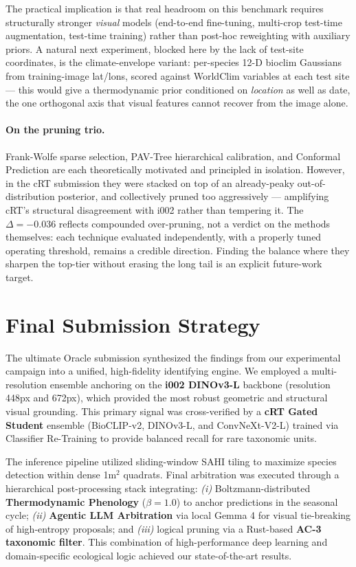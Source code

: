 \documentclass[10pt,twocolumn,letterpaper]{article}
\begin{document}
The practical implication is that real headroom on this benchmark requires structurally stronger \emph{visual} models (end-to-end fine-tuning, multi-crop test-time augmentation, test-time training) rather than post-hoc reweighting with auxiliary priors. A natural next experiment, blocked here by the lack of test-site coordinates, is the climate-envelope variant: per-species 12-D bioclim Gaussians from training-image lat/lons, scored against WorldClim variables at each test site --- this would give a thermodynamic prior conditioned on \emph{location} as well as date, the one orthogonal axis that visual features cannot recover from the image alone.

\paragraph{On the pruning trio.} Frank-Wolfe sparse selection, PAV-Tree hierarchical calibration, and Conformal Prediction are each theoretically motivated and principled in isolation. However, in the cRT submission they were stacked on top of an already-peaky out-of-distribution posterior, and collectively pruned too aggressively --- amplifying cRT's structural disagreement with i002 rather than tempering it. The $\Delta = -0.036$ reflects compounded over-pruning, not a verdict on the methods themselves: each technique evaluated independently, with a properly tuned operating threshold, remains a credible direction. Finding the balance where they sharpen the top-tier without erasing the long tail is an explicit future-work target.

\section{Final Submission Strategy}

The ultimate Oracle submission synthesized the findings from our experimental campaign into a unified, high-fidelity identifying engine. We employed a multi-resolution ensemble anchoring on the \textbf{i002 DINOv3-L} backbone (resolution 448px and 672px), which provided the most robust geometric and structural visual grounding. This primary signal was cross-verified by a \textbf{cRT Gated Student} ensemble (BioCLIP-v2, DINOv3-L, and ConvNeXt-V2-L) trained via Classifier Re-Training to provide balanced recall for rare taxonomic units.

The inference pipeline utilized sliding-window SAHI tiling to maximize species detection within dense 1m$^2$ quadrats. Final arbitration was executed through a hierarchical post-processing stack integrating: \textit{(i)} Boltzmann-distributed \textbf{Thermodynamic Phenology} ($\beta=1.0$) to anchor predictions in the seasonal cycle; \textit{(ii)} \textbf{Agentic LLM Arbitration} via local Gemma 4 for visual tie-breaking of high-entropy proposals; and \textit{(iii)} logical pruning via a Rust-based \textbf{AC-3 taxonomic filter}. This combination of high-performance deep learning and domain-specific ecological logic achieved our state-of-the-art results.
\end{document}

